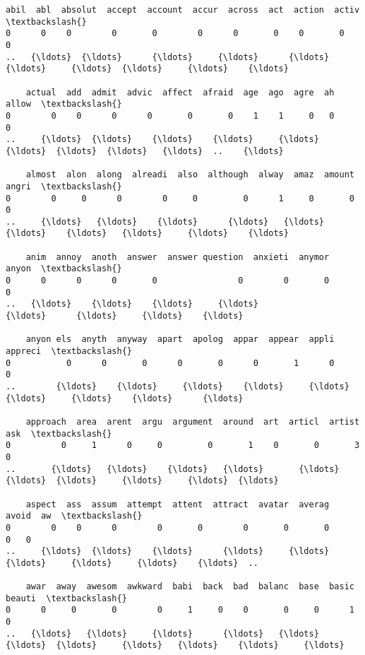 \documentclass[11pt]{article}
\begin{document}
    \begin{Verbatim}[commandchars=\\\{\}]
    abil  abl  absolut  accept  account  accur  across  act  action  activ  \textbackslash{}
0      0    0        0       0        0      0       0    0       0      0   
..   {\ldots}  {\ldots}      {\ldots}     {\ldots}      {\ldots}    {\ldots}     {\ldots}  {\ldots}     {\ldots}    {\ldots}   

    actual  add  admit  advic  affect  afraid  age  ago  agre  ah  allow  \textbackslash{}
0        0    0      0      0       0       0    1    1     0   0      0   
..     {\ldots}  {\ldots}    {\ldots}    {\ldots}     {\ldots}     {\ldots}  {\ldots}  {\ldots}   {\ldots}  ..    {\ldots}   

    almost  alon  along  alreadi  also  although  alway  amaz  amount  angri  \textbackslash{}
0        0     0      0        0     0         0      1     0       0      0   
..     {\ldots}   {\ldots}    {\ldots}      {\ldots}   {\ldots}       {\ldots}    {\ldots}   {\ldots}     {\ldots}    {\ldots}   

    anim  annoy  anoth  answer  answer question  anxieti  anymor  anyon  \textbackslash{}
0      0      0      0       0                0        0       0      0   
..   {\ldots}    {\ldots}    {\ldots}     {\ldots}              {\ldots}      {\ldots}     {\ldots}    {\ldots}   

    anyon els  anyth  anyway  apart  apolog  appar  appear  appli  appreci  \textbackslash{}
0           0      0       0      0       0      0       1      0        0   
..        {\ldots}    {\ldots}     {\ldots}    {\ldots}     {\ldots}    {\ldots}     {\ldots}    {\ldots}      {\ldots}   

    approach  area  arent  argu  argument  around  art  articl  artist  ask  \textbackslash{}
0          0     1      0     0         0       1    0       0       3    0   
..       {\ldots}   {\ldots}    {\ldots}   {\ldots}       {\ldots}     {\ldots}  {\ldots}     {\ldots}     {\ldots}  {\ldots}   

    aspect  ass  assum  attempt  attent  attract  avatar  averag  avoid  aw  \textbackslash{}
0        0    0      0        0       0        0       0       0      0   0   
..     {\ldots}  {\ldots}    {\ldots}      {\ldots}     {\ldots}      {\ldots}     {\ldots}     {\ldots}    {\ldots}  ..   

    awar  away  awesom  awkward  babi  back  bad  balanc  base  basic  beauti  \textbackslash{}
0      0     0       0        0     1     0    0       0     0      1       0   
..   {\ldots}   {\ldots}     {\ldots}      {\ldots}   {\ldots}   {\ldots}  {\ldots}     {\ldots}   {\ldots}    {\ldots}     {\ldots}   


\end{Verbatim}
\end{document}
